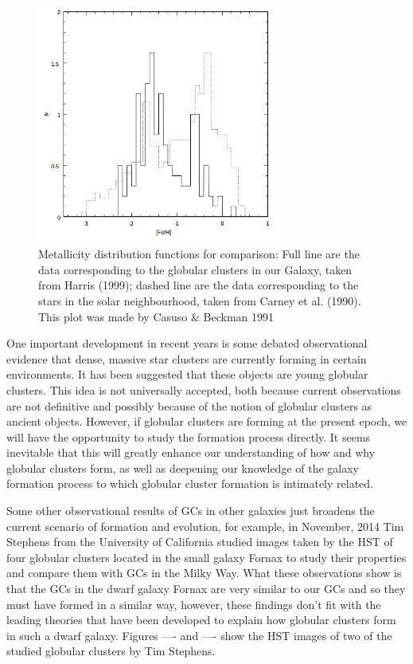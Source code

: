\begin{figure}[H]
\centering
\includegraphics[width=8cm]{images/metal.png}
\caption[Iy]{Metallicity distribution functions for comparison: Full
line are the data corresponding to the globular clusters in our Galaxy, taken
from Harris (1999); dashed line are the data corresponding to
the stars in the solar neighbourhood, taken from Carney et
al. (1990). This plot was made by Casuso \& Beckman 1991}
\end{figure}

One important development in recent years is some debated observational evidence that dense, massive star clusters are currently forming in certain environments. It has been suggested that these objects are young globular clusters. This idea is not universally accepted, both because current observations are not definitive and possibly because of the notion of globular clusters as ancient objects. However, if globular clusters are forming at the present epoch, we will have the opportunity to study the formation process directly. It seems inevitable that this will greatly enhance our understanding of how and why globular clusters form, as well as deepening our knowledge of the galaxy formation process to which globular cluster formation is intimately related.

Some other observational results of GCs in other galaxies just broadens the current scenario of formation and evolution, for example, in November, 2014 Tim Stephens from the University of California studied images taken by the HST of four globular clusters located in the small galaxy Fornax to study their properties and compare them with GCs in the Milky Way. What these observations show is that the GCs in the dwarf galaxy Fornax are very similar to our GCs and so they must have formed in a similar way, however, these findings don't fit with the leading theories that have been developed to explain how globular clusters form in such a dwarf galaxy. Figures ---- and ---- show the HST images of two of the studied globular clusters by Tim Stephens.   

